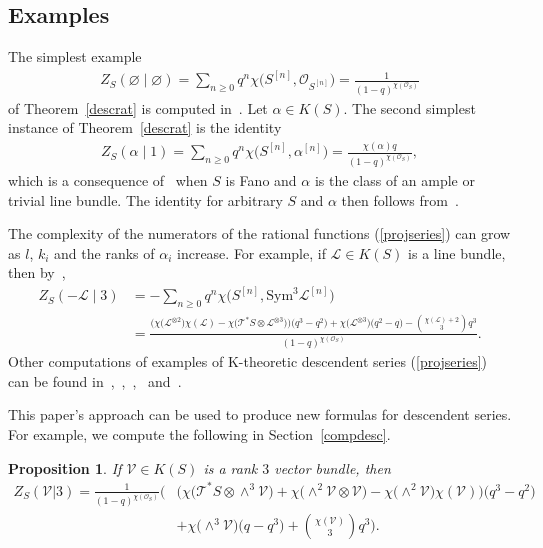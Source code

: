 \documentclass[pdftex]{sigma}
\newtheorem{Proposition}[Theorem]{Proposition}
 { \theoremstyle{definition}
\newtheorem{Definition}[Theorem]{Definition}
\newtheorem{Note}[Theorem]{Note}
\newtheorem{Example}[Theorem]{Example}
\newtheorem{Remark}[Theorem]{Remark} }
\numberwithin{equation}{section}
\newcommand{\Sym}{\mathrm{Sym}}
\def\O{\mathcal{O}}
\begin{document}
\subsection{Examples}
The simplest example
\begin{gather*}
Z_{S}(\varnothing\mid\varnothing)= \sum_{n\geq 0} q^n \chi\big(S^{[n]},\O_{S^{[n]}}\big)=\frac{1}{(1-q)^{\chi(\mathcal{O}_S)}}
\end{gather*}
 of Theorem~\ref{descrat} is computed in~\cite[Proposition 3.3(b)]{G}.
Let $\alpha\in K(S)$. The second simplest instance of Theorem~\ref{descrat} is the identity
\begin{gather*}
Z_{S}(\alpha\mid 1)=\sum_{n\geq 0} q^n \chi\big(S^{[n]},\alpha^{[n]}\big)=\frac{ \chi(\alpha) q}{(1-q)^{\chi(\mathcal{O}_S)}},
\end{gather*}
which is a consequence of~\cite[Corollary~1.3]{D} when $S$ is Fano and $\alpha$ is the class of an ample or trivial line bundle. The identity for arbitrary $S$ and $\alpha$ then follows from~\cite[Theorem~4.2]{EGL}.

The complexity of the numerators of the rational functions (\ref{projseries}) can grow as $l$, $k_i$ and the ranks of $\alpha_i$ increase. For example, if $\mathcal{L}\in K(S)$ is a line bundle, then by~\cite[Theorem~5.25]{Sc2},
\begin{align*}
Z_S(-\mathcal{L}\mid 3)&=-\sum_{n\geq 0} q^{n}\chi\big(S^{[n]},\Sym^3 \mathcal{L}^{[n]}\big)
\\
&= \frac{\big(\chi\big(\mathcal{L}^{\otimes 2}\big)\chi(\mathcal{L})-\chi\big(\mathcal{T}^*S\otimes \mathcal{L}^{\otimes 3}\big) \big)\big(q^3-q^2\big)+\chi\big(\mathcal{L}^{\otimes 3}\big) \big(q^2-q\big)-\binom{\chi(\mathcal{L})+2}{3} q^3}{(1-q)^{\chi(\mathcal{O}_S)}}.
\end{align*}
Other computations of examples of K-theoretic descendent series (\ref{projseries}) can be found in~\cite[Section~6]{A},~\cite[Corollary~8.11]{K},~\cite[Section~5]{Sc1},~\cite[Theorem~5.25]{Sc2} and~\cite[Section~7]{Z}.

This paper's approach can be used to produce new formulas for descendent series. For example, we compute the following in Section~\ref{compdesc}.
\begin{Proposition} \label{newdesc}
If $\mathcal{V}\in K(S)$ is a rank $3$ vector bundle, then
\begin{align*}
Z_{S}(\mathcal{V}|3) = \frac{1}{(1-q)^{\chi(\mathcal{O}_S)}} \bigg(&\big(\chi\big(\mathcal{T}^{*}S\otimes \wedge^3 \mathcal{V}\big)+\chi\big({\wedge}^2\mathcal{V}\otimes \mathcal{V}\big)-\chi\big({\wedge}^2\mathcal{V}\big)\chi( \mathcal{V})\big)\big(q^3-q^2\big)
\\
&+\chi\big({\wedge}^3\mathcal{V}\big)\big(q-q^3\big)+\binom{\chi(\mathcal{V})}{3} q^3\bigg).
\end{align*}
\end{Proposition}
\end{document}
